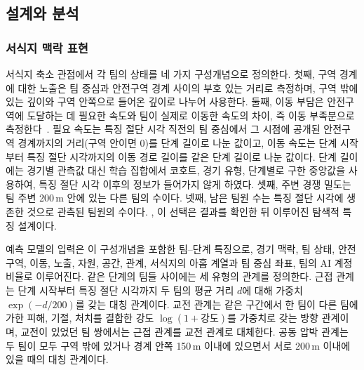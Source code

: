 \subsection{설계와 분석}
\label{sec:method:design}


\subsubsection{서식지 맥락 표현}
\label{sec:method:representation}
서식지 축소 관점에서 각 팀의 상태를 네 가지 구성개념으로 정의한다.
첫째, 구역 경계에 대한 노출은 팀 중심과 안전구역 경계 사이의 부호 있는 거리로 측정하며, 구역 밖에 있는 깊이와 구역 안쪽으로 들어온 깊이로 나누어 사용한다.
둘째, 이동 부담은 안전구역에 도달하는 데 필요한 속도와 팀이 실제로 이동한 속도의 차이, 즉 이동 부족분으로 측정한다~\cite{Nathan08}.
필요 속도는 특징 절단 시각 직전의 팀 중심에서 그 시점에 공개된 안전구역 경계까지의 거리(구역 안이면 0)를 단계 길이로 나눈 값이고, 이동 속도는 단계 시작부터 특징 절단 시각까지의 이동 경로 길이를 같은 단계 길이로 나눈 값이다.
단계 길이에는 경기별 관측값 대신 학습 집합에서 코호트, 경기 유형, 단계별로 구한 중앙값을 사용하여, 특징 절단 시각 이후의 정보가 들어가지 않게 하였다.
셋째, 주변 경쟁 밀도는 팀 주변 200\,m 안에 있는 다른 팀의 수이다.
넷째, 남은 팀원 수는 특징 절단 시각에 생존한 것으로 관측된 팀원의 수이다.
, 이 선택은 결과를 확인한 뒤 이루어진 탐색적 특징 설계이다.

예측 모델의 입력은 이 구성개념을 포함한 팀--단계 특징으로, 경기 맥락, 팀 상태, 안전구역, 이동, 노출, 자원, 공간, 관계, 서식지의 아홉 계열과 팀 중심 좌표, 팀의 AI 계정 비율로 이루어진다.
같은 단계의 팀들 사이에는 세 유형의 관계를 정의한다.
근접 관계는 단계 시작부터 특징 절단 시각까지 두 팀의 평균 거리 $d$에 대해 가중치 $\exp(-d/200)$를 갖는 대칭 관계이다.
교전 관계는 같은 구간에서 한 팀이 다른 팀에 가한 피해, 기절, 처치를 결합한 강도 $\log(1+\text{강도})$를 가중치로 갖는 방향 관계이며, 교전이 있었던 팀 쌍에서는 근접 관계를 교전 관계로 대체한다.
공동 압박 관계는 두 팀이 모두 구역 밖에 있거나 경계 안쪽 150\,m 이내에 있으면서 서로 200\,m 이내에 있을 때의 대칭 관계이다.

